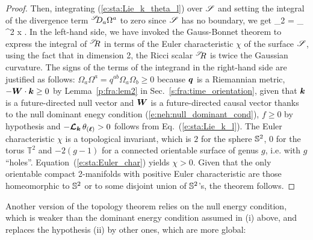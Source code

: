 \begin{proof}
Then, integrating (\ref{e:sta:Lie_k_theta_l}) over $\mathscr{S}$
and setting the integral of the divergence term ${}^{\mathscr{S}}\!\!D_a \Omega^a$ to zero since
$\mathscr{S}$ has no boundary, we get
\be \label{e:sta:Euler_char}
    _{2\pi\chi} = \int_\Sp {}
           \, \D^2 x .
\ee
In the left-hand side, we have invoked the Gauss-Bonnet theorem
to express the integral of ${}^{\mathscr{S}}\!\! R$ in terms
of the Euler characteristic $\chi$ of the
surface $\mathscr{S}$, using the fact that in dimension 2,
the Ricci scalar ${}^{\mathscr{S}}\!\! R$ is twice the
Gaussian curvature.
The signs of the terms of the integrand in the right-hand side
are justified as follows:
$\Omega_a \Omega^a = q^{ab} \Omega_a \Omega_b \geq 0$ because $\bm{q}$ is a Riemannian metric,
$- \bm{W}\cdot\bm{k} \geq 0$ by Lemma~\ref{p:fra:lem2} in Sec.~\ref{s:fra:time_orientation},
given that $\bm{k}$ is a future-directed null vector and $\bm{W}$ is a future-directed
causal vector thanks to the null dominant enegy condition (\ref{e:neh:null_dominant_cond}),
$f\geq 0$ by hypothesis and $- \bm{\mathcal{L}}_{\bm{\bm{k}}}\, \theta_{(\bm{\ell})} > 0$
follows from Eq.~(\ref{e:sta:Lie_k_l}). The Euler characteristic $\chi$ is a topological
invariant, which is $2$ for the sphere $\mathbb{S}^2$, $0$ for the torus $\mathbb{T}^2$
and $-2(g-1)$
for a connected orientable surface of genus $g$, i.e. with $g$ ``holes''.
Equation~(\ref{e:sta:Euler_char}) yields $\chi > 0$. Given that the only orientable
compact 2-manifolds
with positive Euler characteristic are those homeomorphic to $\mathbb{S}^2$ or
to some disjoint union of $\mathbb{S}^2$'s, the theorem follows.
\end{proof}

Another version of the topology theorem relies on the null energy
condition, which is weaker than the dominant energy condition assumed in (i) above,
and replaces the hypothesis (ii) by other ones, which are more global:

